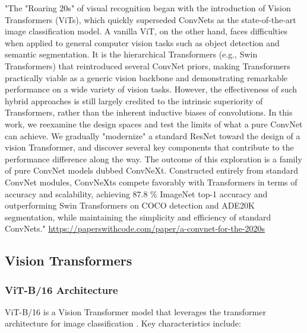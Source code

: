 "The "Roaring 20s" of visual recognition began with the introduction of Vision Transformers (ViTs), which quickly superseded ConvNets as the state-of-the-art image classification model. A vanilla ViT, on the other hand, faces difficulties when applied to general computer vision tasks such as object detection and semantic segmentation. It is the hierarchical Transformers (e.g., Swin Transformers) that reintroduced several ConvNet priors, making Transformers practically viable as a generic vision backbone and demonstrating remarkable performance on a wide variety of vision tasks. However, the effectiveness of such hybrid approaches is still largely credited to the intrinsic superiority of Transformers, rather than the inherent inductive biases of convolutions. In this work, we reexamine the design spaces and test the limits of what a pure ConvNet can achieve. We gradually "modernize" a standard ResNet toward the design of a vision Transformer, and discover several key components that contribute to the performance difference along the way. The outcome of this exploration is a family of pure ConvNet models dubbed ConvNeXt. Constructed entirely from standard ConvNet modules, ConvNeXts compete favorably with Transformers in terms of accuracy and scalability, achieving 87.8 \% ImageNet top-1 accuracy and outperforming Swin Transformers on COCO detection and ADE20K segmentation, while maintaining the simplicity and efficiency of standard ConvNets." \url{https://paperswithcode.com/paper/a-convnet-for-the-2020s}


\subsection{Vision Transformers}
\label{sec:ViTs}


\subsubsection{ViT-B/16 Architecture}
\label{sec:vitb16}
ViT-B/16 is a Vision Transformer model that leverages the transformer architecture for image classification \cite{dosovitskiy2021imageworth16x16words}. Key characteristics include:

